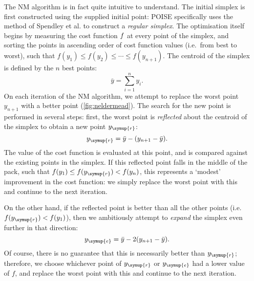 The NM algorithm is in fact quite intuitive to understand.
The initial simplex is first constructed using the supplied initial point: POISE specifically uses the method of Spendley et al.\autocite{Spendley1962T} to construct a \textit{regular simplex}.
The optimisation itself begins by measuring the cost function $f\/$ at every point of the simplex, and sorting the points in ascending order of cost function values (i.e.\ from best to worst), such that $f(y_1) \leq f(y_2) \leq \cdots \leq f(y_{n+1})$.
The centroid of the simplex is defined by the $n$ best points:
\begin{equation}
    \label{eq:simplex_centroid}
    \bar{y} = \sum_{i=1}^n y_i.
\end{equation}
On each iteration of the NM algorithm, we attempt to replace the worst point $y_{n+1}$  with a better point (\cref{fig:neldermead}).
The search for the new point is performed in several steps: first, the worst point is \textit{reflected} about the centroid of the simplex to obtain a new point $y_{\symup{r}}$:
\begin{equation}
    \label{eq:nm_reflect}
    y_{\symup{r}} = \bar{y} - (y_{n+1} - \bar{y}).
\end{equation}
The value of the cost function is evaluated at this point, and is compared against the existing points in the simplex.
If this reflected point falls in the middle of the pack, such that $f(y_1) \leq f(y_{\symup{r}}) < f(y_n)$, this represents a `modest' improvement in the cost function: we simply replace the worst point with this and continue to the next iteration.

On the other hand, if the reflected point is better than all the other points (i.e.\ $f(y_{\symup{r}}) < f(y_1)$), then we ambitiously attempt to \textit{expand} the simplex even further in that direction:
\begin{equation}
    \label{eq:nm_expand}
    y_{\symup{e}} = \bar{y} - 2(y_{n+1} - \bar{y}).
\end{equation}
Of course, there is no guarantee that this is necessarily better than $y_{\symup{r}}$; therefore, we choose whichever point of $y_{\symup{r}}$ or $y_{\symup{e}}$ had a lower value of $f$, and replace the worst point with this and continue to the next iteration.


